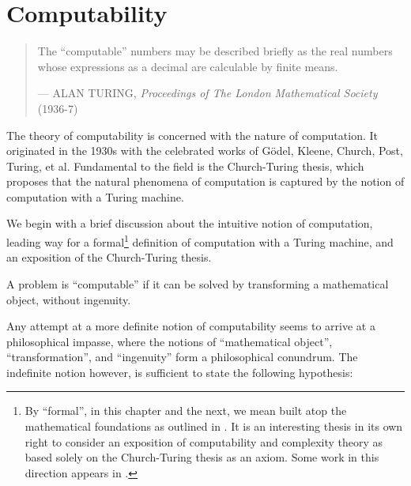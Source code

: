 \chapter{Computability} \label{sec:background-computability}

\begin{quotation}

\footnotesize\sffamily\itshape

\begin{flushright}

The ``computable'' numbers may be described briefly as the real numbers whose
expressions as a decimal are calculable by finite means.

\smallbreak

\upshape

--- ALAN TURING, {\itshape Proceedings of The London Mathematical Society} (1936-7)

\end{flushright}

\end{quotation}

The theory of computability is concerned with the nature of computation. It
originated in the 1930s with the celebrated works of G\"odel, Kleene, Church,
Post, Turing, et al.  Fundamental to the field is the Church-Turing thesis,
which proposes that the natural phenomena of computation is captured by the
notion of computation with a Turing machine.

We begin with a brief discussion about the intuitive notion of computation,
leading way for a formal\footnote{By ``formal'', in this chapter and the next,
we mean built atop the mathematical foundations as outlined in
. It is an interesting thesis in
its own right to consider an exposition of computability and complexity theory
as based solely on the Church-Turing thesis as an axiom. Some work in this
direction appears in \cite{markov-1954}.} definition of computation with a
Turing machine, and an exposition of the Church-Turing thesis.

\begin{notion} A problem is ``computable'' if it can be solved by transforming
a mathematical object, without ingenuity.
\end{notion}

Any attempt at a more definite notion of computability seems to arrive at a
philosophical impasse, where the notions of ``mathematical object'',
``transformation'', and ``ingenuity'' form a philosophical conundrum. The
indefinite notion however, is sufficient to state the following hypothesis:

